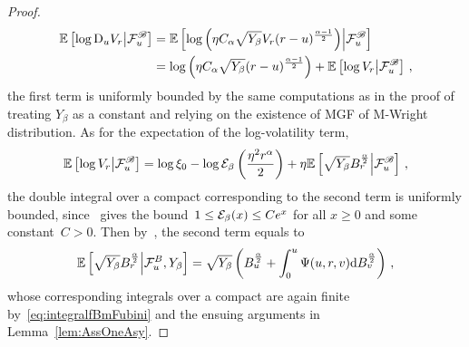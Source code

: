\begin{proof}
\begin{align*}
    \mathbb{E}\left[\log\mathrm{D}_u V_r\middle\vert\mathcal{F}^{\mathscr{B}}_u\right] &= \mathbb{E}\left[\log\left(\eta C_\alpha \sqrt{Y_\beta} V_r (r-u)^{\frac{\alpha-1}2}\right)\middle\vert\mathcal{F}^{\mathscr{B}}_u\right] \\
    &= \log\left(\eta C_\alpha \sqrt{Y_\beta} (r-u)^{\frac{\alpha-1}2}\right) + \mathbb{E}\left[\log V_r\middle\vert\mathcal{F}^{\mathscr{B}}_u\right]\,,
\end{align*}
the first term is uniformly bounded by the same computations as in the proof of~\cite[Lemma~6.15]{Jacquier2021RoughOptions} treating $Y_\beta$ as a constant and relying on the existence of MGF of M-Wright distribution. As for the expectation of the log-volatility term,
\begin{align*}
    \mathbb{E}\left[\log V_r\middle\vert\mathcal{F}^{\mathscr{B}}_u\right] = \log\xi_0 - \log\mathcal{E}_\beta\left(\frac{\eta^2 r^\alpha}{2}\right) + \eta\mathbb{E}\left[\sqrt{Y_\beta} B^{\frac\alpha2}_r\middle\vert\mathcal{F}^{\mathscr{B}}_u\right]\,,
\end{align*}
the double integral over a compact corresponding to the second term is uniformly bounded, since~\cite[Theorem~9]{Jia2019SomeFunction} gives the bound~$1\leq\mathcal{E}_\beta(x)\leq Ce^{x}$ for all $x\geq 0$ and some constant~$C>0$. Then by~\cite[Theorem~7.1]{Pipiras2001AreComplete}, the second term equals to
\begin{equation*}
    \mathbb{E}\left[\sqrt{Y_\beta} B^{\frac\alpha2}_r\middle\vert\mathcal{F}^B_u, Y_\beta\right] = \sqrt{Y_\beta}\left(B^{\frac\alpha2}_u + \int_0^u\Psi(u,r,v)\mathrm{d} B^{\frac\alpha2}_v\right)\,,
\end{equation*}
whose corresponding integrals over a compact are again finite by~\eqref{eq:integralfBmFubini} and the ensuing arguments in Lemma~\ref{lem:AssOneAsy}.
\end{proof}
